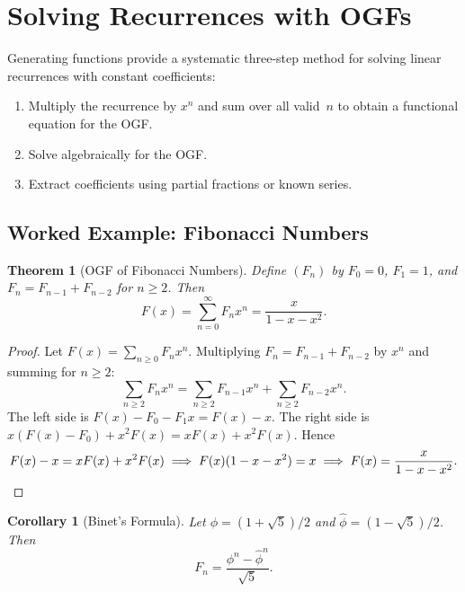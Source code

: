 \documentclass[12pt,a4paper,openany]{book}
\theoremstyle{definition}
\theoremstyle{plain}
\newtheorem{theorem}[definition]{Theorem}
\newtheorem{corollary}[definition]{Corollary}
\theoremstyle{remark}
\begin{document}

\section{Solving Recurrences with OGFs}\label{sec:ogf-recurrences}

Generating functions provide a systematic three-step method for solving
linear recurrences with constant coefficients:
\begin{enumerate}
  \item Multiply the recurrence by $x^n$ and sum over all valid~$n$ to
    obtain a functional equation for the OGF.
  \item Solve algebraically for the OGF.
  \item Extract coefficients using partial fractions or known series.
\end{enumerate}

\subsection{Worked Example: Fibonacci Numbers}\label{sec:ogf-fibonacci}

\begin{theorem}[OGF of Fibonacci Numbers]\label{thm:fib-ogf}
Define $(F_n)$ by $F_0 = 0$, $F_1 = 1$, and $F_n = F_{n-1}+F_{n-2}$
for $n \ge 2$.  Then
\[
  F(x) = \sum_{n=0}^{\infty}F_n x^n = \frac{x}{1-x-x^2}.
\]
\end{theorem}

\begin{proof}
Let $F(x) = \sum_{n\ge 0}F_n x^n$.  Multiplying $F_n = F_{n-1}+F_{n-2}$
by $x^n$ and summing for $n \ge 2$:
\[
  \sum_{n\ge 2}F_n x^n
  = \sum_{n\ge 2}F_{n-1}x^n + \sum_{n\ge 2}F_{n-2}x^n.
\]
The left side is $F(x) - F_0 - F_1 x = F(x) - x$.  The right side is
$x(F(x)-F_0) + x^2 F(x) = xF(x) + x^2 F(x)$.  Hence
\[
  F(x) - x = xF(x) + x^2 F(x)
  \implies
  F(x)(1 - x - x^2) = x
  \implies
  F(x) = \frac{x}{1-x-x^2}. \qedhere
\]
\end{proof}

\begin{corollary}[Binet's Formula]\label{cor:binet}
Let $\phi = (1+\sqrt{5})/2$ and $\hat\phi = (1-\sqrt{5})/2$.  Then
\[
  F_n = \frac{\phi^n - \hat\phi^n}{\sqrt{5}}.
\]
\end{corollary}
\end{document}
